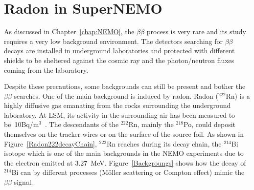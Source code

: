 \documentclass[main.tex]{subfiles}
\begin{document}
\chapter{Radon in SuperNEMO}\label{chap:Radon}







\NI As discussed in Chapter~\ref{chap:NEMO}, the $\beta\beta$ process is very rare and its study requires a very low background environment. The detectors searching for $\beta\beta$ decays are installed in underground laboratories and protected with different shields to be sheltered against the cosmic ray and the photon/neutron fluxes coming from the laboratory.


\bigskip


\NI Despite these precautions, some backgrounds can still be present and bother the $\beta\beta$ searches. One of the main background is induced by radon. Radon ($^{\text{222}}$Rn) is a highly diffusive gas emanating from the rocks surrounding the underground laboratory. At LSM, its activity in the surrounding air has been measured to be~10Bq/m$^\text{3}$~\cite{RadonLSM}. The descendants of the $^{\text{222}}$Rn, mainly the $^{\text{218}}$Po, could deposit themselves on the tracker wires or on the surface of the source foil. As shown in Figure~\ref{Radon222decayChain}, $^{\text{222}}$Rn reaches during its decay chain, the $^{\text{214}}$Bi isotope which is one of the main backgrounds in the NEMO experiments due to the electron emitted at 3.27~MeV. Figure~\ref{Backgroungs} shows how the decay of $^{\text{214}}$Bi can by different processes (Möller scattering or Compton effect) mimic the $\beta\beta$ signal. 
\end{document}
